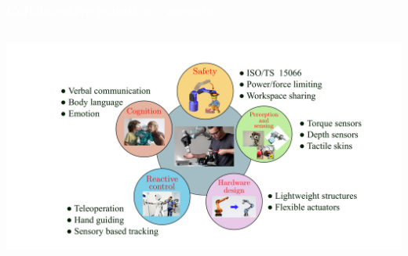 \begin{frame}[noframenumbering]
  \frametitle{{\textcolor{white}{\hspace{0.3cm}Collaborative robotics -- aspects}}}


\begin{columns}

\column{1.2\paperwidth}

\hspace{-15mm}         
\includegraphics[width=1.2\paperwidth ]{figures/5.pdf}
    

\end{columns}




\end{frame}













